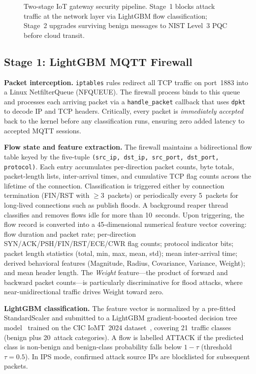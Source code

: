 \documentclass[conference]{IEEEtran}
\begin{document}
\begin{figure}[!t]
\caption{Two-stage IoT gateway security pipeline. Stage~1 blocks attack traffic at the network layer via LightGBM flow classification; Stage~2 upgrades surviving benign messages to NIST Level~3 PQC before cloud transit.}
\label{fig:arch}
\vspace{-4mm}
\end{figure}

\subsection{Stage 1: LightGBM MQTT Firewall}

\textbf{Packet interception.} \texttt{iptables} rules redirect all TCP traffic on port~1883 into a Linux NetfilterQueue (NFQUEUE). The firewall process binds to this queue and processes each arriving packet via a \texttt{handle\_packet} callback that uses \texttt{dpkt} to decode IP and TCP headers. Critically, every packet is \textit{immediately accepted} back to the kernel before any classification runs, ensuring zero added latency to accepted MQTT sessions.

\textbf{Flow state and feature extraction.} The firewall maintains a bidirectional flow table keyed by the five-tuple \texttt{(src\_ip, dst\_ip, src\_port, dst\_port, protocol)}. Each entry accumulates per-direction packet counts, byte totals, packet-length lists, inter-arrival times, and cumulative TCP flag counts across the lifetime of the connection. Classification is triggered either by connection termination (FIN/RST with $\geq$3~packets) or periodically every 5~packets for long-lived connections such as publish floods. A background reaper thread classifies and removes flows idle for more than 10~seconds. Upon triggering, the flow record is converted into a 45-dimensional numerical feature vector covering: flow duration and packet rate; per-direction SYN/ACK/PSH/FIN/RST/ECE/CWR flag counts; protocol indicator bits; packet length statistics (total, min, max, mean, std); mean inter-arrival time; derived behavioral features (Magnitude, Radius, Covariance, Variance, Weight); and mean header length. The \textit{Weight} feature---the product of forward and backward packet counts---is particularly discriminative for flood attacks, where near-unidirectional traffic drives Weight toward zero.

\textbf{LightGBM classification.} The feature vector is normalized by a pre-fitted StandardScaler and submitted to a LightGBM gradient-boosted decision tree model~\cite{lightgbm2017} trained on the CIC IoMT~2024 dataset~\cite{ciciomt2024}, covering 21~traffic classes (benign plus 20~attack categories). A flow is labelled ATTACK if the predicted class is non-benign and benign-class probability falls below $1 - \tau$ (threshold $\tau = 0.5$). In IPS mode, confirmed attack source IPs are blocklisted for subsequent packets.
\end{document}
